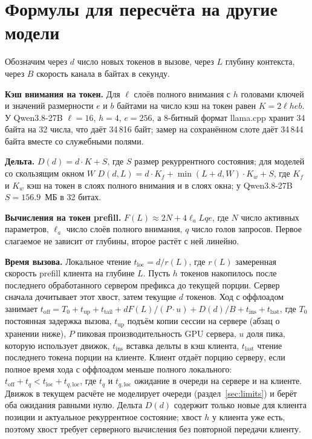 \appendix

\section{Формулы для пересчёта на другие модели}
\label{app:formulas}

Обозначим через $d$ число новых токенов в вызове, через $L$ глубину контекста, через $B$ скорость канала в байтах в
секунду.

\textbf{Кэш внимания на токен.} Для $\ell$ слоёв полного внимания с $h$ головами ключей и значений размерности $e$ и
$b$ байтами на число кэш на токен равен $K = 2 \ell h e b$. У Qwen3.8-27B $\ell = 16$, $h = 4$, $e = 256$, а
8-битный формат llama.cpp хранит 34 байта на 32 числа, что даёт 34\,816 байт; замер на сохранённом слоте даёт
34\,844 байта вместе со служебными полями.

\textbf{Дельта.} $D(d) = d \cdot K + S$, где $S$ размер рекуррентного состояния; для моделей со скользящим окном $W$
$D(d,L) = d \cdot K_f + \min(L+d, W) \cdot K_w + S$, где $K_f$ и $K_w$ кэш на токен в слоях полного внимания и в слоях окна; у Qwen3.8-27B $S = 156.9$~МБ в 32
битах.

\textbf{Вычисления на токен prefill.} $F(L) \approx 2N + 4 \ell_a L q e$, где $N$ число активных параметров,
$\ell_a$ число слоёв полного внимания, $q$ число голов запросов. Первое слагаемое не зависит от глубины, второе
растёт с ней линейно.

\textbf{Время вызова.} Локальное чтение $t_{\text{loc}} = d / r(L)$, где $r(L)$ замеренная скорость prefill клиента на
глубине $L$. Пусть $h$ токенов накопилось после последнего обработанного сервером префикса до текущей порции.
Сервер сначала дочитывает этот хвост, затем текущие $d$ токенов.
Ход с оффлоадом занимает $t_{\text{off}} = T_0 + t_{\text{up}} + t_{\text{tail}} + d F(L) / (P \cdot u) + D(d) / B +
t_{\text{ins}} + t_{\text{last}}$, где $T_0$ постоянная задержка вызова, $t_{\text{up}}$ подъём копии сессии на сервере
(абзац о хранении ниже), $P$ пиковая производительность GPU сервера, $u$ доля пика, которую использует движок,
$t_{\text{ins}}$ вставка дельты в кэш клиента, $t_{\text{last}}$ чтение последнего токена порции на клиенте. Клиент
отдаёт порцию серверу, если полное время хода с оффлоадом меньше полного локального: $t_{\text{off}} + t_q <
t_{\text{loc}} + t_{q,\text{loc}}$, где $t_q$ и $t_{q,\text{loc}}$ ожидание в очереди на сервере и на клиенте. Движок
в текущем расчёте не моделирует очереди (раздел~\ref{sec:limits}) и берёт оба ожидания равными нулю.
Дельта $D(d)$ содержит только новые для клиента позиции и актуальное рекуррентное состояние; хвост $h$
у клиента уже есть, поэтому хвост требует серверного вычисления без повторной передачи клиенту.

